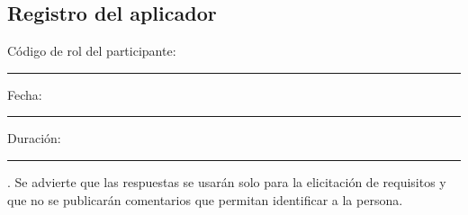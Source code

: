 \subsection*{Registro del aplicador}
C\'odigo de rol del participante: \rule{3cm}{0.4pt}\quad Fecha: \rule{2.5cm}{0.4pt}\quad Duración: \rule{2cm}{0.4pt}.
Se advierte que las respuestas se usar\'an solo para la elicitaci\'on de requisitos y que no se publicar\'an comentarios que permitan identificar a la persona.

